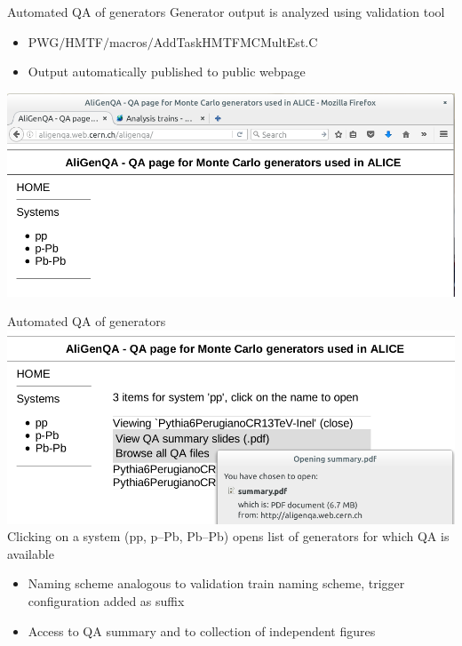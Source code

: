 \documentclass[table]{beamer}
\begin{document}
\begin{frame}{Automated QA of generators}
Generator output is analyzed using validation tool
\begin{itemize}
    \item PWG$/$HMTF$/$macros$/$AddTaskHMTFMCMultEst.C
    \item Output automatically published to public webpage
\end{itemize}
    \includegraphics[width=\textwidth]{../fig/aligenqa_webpage.png}
\end{frame}

\begin{frame}{Automated QA of generators}
    \includegraphics[width=\textwidth]{../fig/open_page.png} \\
    Clicking on a system (pp, p--Pb, Pb--Pb) opens list of generators for which QA is available
\begin{itemize}
    \item Naming scheme analogous to validation train naming scheme, trigger configuration added as suffix
    \item Access to QA summary and to collection of independent figures
\end{itemize}
\end{frame}
\end{document}
